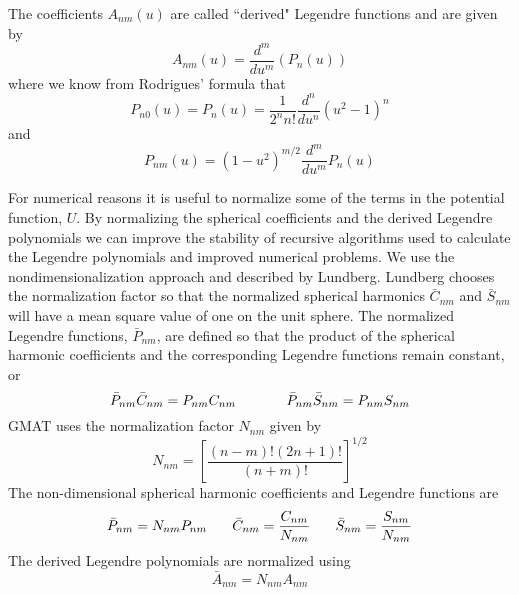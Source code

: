 The coefficients $A_{nm}(u)$ are called ``derived" Legendre
functions and are given by
%
\begin{equation}
    A_{nm}(u) = \frac{d^m}{du^m}(P_n(u))
\end{equation}
%
where we know from Rodrigues' \cite{Lundberg:88} formula that
%
\begin{equation}
    P_{n0}(u) = P_n(u) = \frac{1}{2^n n!}\frac{d^n}{du^n}(u^2 - 1)^n
\end{equation}
%
and
%
\begin{equation}
    P_{nm}(u) = (1 - u^2)^{m/2}\frac{d^m}{du^m}P_n(u)
\end{equation}
%

For numerical reasons it is useful to normalize some of the terms in
the potential function, $U$.  By normalizing the spherical
coefficients and the derived Legendre polynomials we can improve the
stability of recursive algorithms used to calculate the Legendre
polynomials and improved numerical problems.  We use the
nondimensionalization approach and described by
Lundberg\cite{Lundberg:88}.  Lundberg chooses the normalization
factor so that the normalized spherical harmonics $\bar{C}_{nm}$ and
$\bar{S}_{nm}$ will have a mean square value of one on the unit
sphere.  The normalized Legendre functions, $\bar{P}_{nm}$, are
defined so that the product of the spherical harmonic coefficients
and the corresponding Legendre functions remain constant, or
%
\begin{equation}
   \bar{P}_{nm}\bar{C}_{nm} = P_{nm}C_{nm}  \hspace{.5 in}  \bar{P}_{nm}\bar{S}_{nm} = P_{nm}S_{nm}
\end{equation}
%
GMAT uses the normalization factor $N_{nm}$ given by
%
\begin{equation}
    N_{nm} =  \left[ \frac{(n-m)!(2n+1)!}{(n+m)!} \right]^{1/2}
\end{equation}
%
The non-dimensional spherical harmonic coefficients and Legendre
functions are
%
\begin{equation}
     \bar{P}_{nm} = N_{nm}P_{nm} \hspace{.25 in} \bar{C}_{nm} =
     \frac{C_{nm}}{N_{nm}} \hspace{.25 in} \bar{S}_{nm} =
     \frac{S_{nm}}{N_{nm}}
\end{equation}
%
The derived Legendre polynomials are normalized using
%
\begin{equation}
    \bar{A}_{nm} = N_{nm} A_{nm} \label{Eq:LegendreNormalization}
\end{equation}
